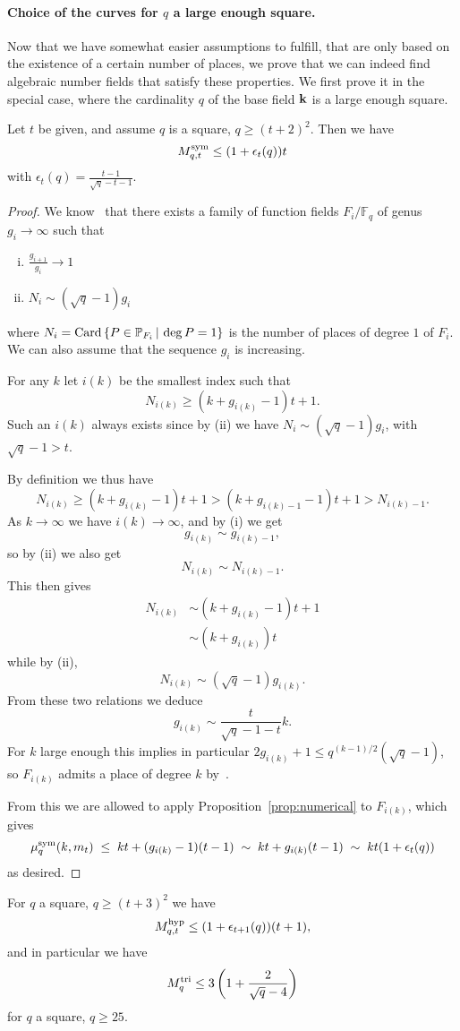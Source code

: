 \paragraph{Choice of the curves for $q$ a large enough square.}
Now that we have somewhat easier assumptions to fulfill, that are only based on
the existence of a certain number of places, we prove that we can indeed find
algebraic number fields that satisfy these properties. We first prove it in the
special case, where the cardinality $q$ of the base field $\mathbf{k}$ is a large enough
square.
\begin{prop}
\label{prop:asymptsquare}
Let $t$ be given, and assume $q$ is a square, $q\geq(t+2)^2$.
Then we have
\[
M^{\textrm{sym}}_{q,t}\leq(1+\epsilon_t(q))t
\]
with $\epsilon_t(q)=\frac{t-1}{\sqrt{q}-t-1}$.
\end{prop}
\begin{proof}
We know~\cite{STV92} that there exists a family of function fields
$F_i/\mathbb{F}_q$ of genus $g_i\to\infty$ such that
\begin{enumerate}[(i)]
  \item $\frac{g_{i+1}}{g_i}\to1$
  \item $N_i\sim (\sqrt q - 1)g_i$
\end{enumerate}
where $N_i = \operatorname{Card}\left\{ P\in\mathbb{P}_{F_i}\,|\,\deg P = 1 \right\}$
is the number of places of degree $1$ of $F_i$. We can also assume that the sequence
$g_i$ is increasing. 

For any $k$ let $i(k)$ be the smallest index such that
\[ N_{i(k)} \geq (k + g_{i(k)}-1)t +1. \]
Such an $i(k)$ always exists since by (ii) we have $N_i\sim (\sqrt q - 1)g_i$,
with $\sqrt q - 1>t$.

By definition we thus have
\[ N_{i(k)} \geq (k + g_{i(k)}-1)t +1 > (k + g_{i(k)-1}-1)t +1 > N_{i(k)-1}. \]
As $k\to\infty$ we have $i(k)\to\infty$, and by (i) we get 
\[
  g_{i(k)}\sim g_{i(k)-1},
\]
so by (ii) we also get 
\[
  N_{i(k)}\sim N_{i(k)-1}.
\]
This then gives
\[ \begin{split} N_{i(k)} &\sim (k + g_{i(k)}-1)t +1\\ &\sim (k + g_{i(k)})t \end{split} \]
while by (ii),
\[ N_{i(k)} \sim (\sqrt q - 1)g_{i(k)}. \]
From these two relations we deduce
\[ g_{i(k)} \sim \frac{t}{\sqrt{q}-1-t}k. \]
For $k$ large enough this implies in particular $2g_{i(k)} +1 \leq q^{(k-1)/2}(\sqrt q-1)$,
so $F_{i(k)}$ admits a place of degree $k$ by~\cite[Cor.~5.2.10]{Stichtenoth09}.

From this we are allowed to apply Proposition~\ref{prop:numerical} to $F_{i(k)}$, which gives
\[ \mu^{\textrm{sym}}_q(k,m_t)\;\leq\; kt+(g_{i(k)}-1)(t-1)\;\sim\; kt+g_{i(k)}(t-1)\;\sim\; kt(1+\epsilon_t(q)) \]
as desired.
\end{proof}
\begin{cor}
\label{cor:asymptsquare}
For $q$ a square, $q\geq(t+3)^2$ we have
\[
M^{\textrm{hyp}}_{q,t}\leq(1+\epsilon_{t+1}(q))(t+1),
\]
and in particular we have
\[ M^{\textrm{tri}}_q\leq 3\left(1+\frac{2}{\sqrt{q}-4}\right) \]
for $q$ a square, $q\geq 25$.
\end{cor}

